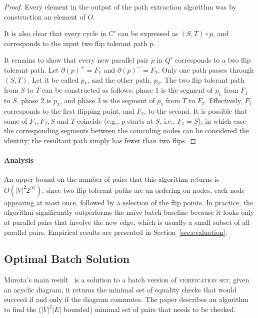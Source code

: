 \documentclass[sigplan,review,anonymous]{acmart}
\begin{document}
\begin{proof}
    Every element in the output of the path extraction algorithm was by construction an element of $O$.

    It is also clear that every cycle in $C'$ can be expressed as $(S, T) \circ p$, and corresponds to the input two flip tolerant path p.
    
    It remains to show that every new parallel pair $p$ in $Q'$ corresponds to a two flip tolerant path.
    Let $\partial(p)^+ = F_1$ and $\partial(p)^- = F_2$. 
    Only one path passes through $(S, T)$. Let it be called $p_1$, and the other path, $p_2$.
    The two flip tolerant path from $S$ to $T$ can be constructed as follows: phase 1 is the segment of $p_1$ from $F_1$ to $S$, phase 2 is $p_2$, and phase 3 is the segment of $p_1$ from $T$ to $F_2$.
    Effectively, $F_1$ corresponds to the first flipping point, and $F_2$, to the second.
    It is possible that some of $F_1, F_2, S$ and $T$ coincide (e.g., $p$ starts at $S$, i.e., $F_1 = S$), in which case the corresponding segments between the coinciding nodes can be considered the identity; the resultant path simply has fewer than two flips.
\end{proof}

\paragraph{Analysis}
An upper bound on the number of pairs that this algorithm returns is $O(|V|^{2} 2^{|V|})$, since two flip tolerant paths are an ordering on nodes, each node appearing at most once, followed by a selection of the flip points.
In practice, the algorithm significantly outperforms the na\"{i}ve batch baseline because it looks only at parallel pairs that involve the new edge, which is usually a small subset of all parallel pairs.
Empirical results are presented in Section~\ref{sec:evaluation}.

\subsection{Optimal Batch Solution}

\label{sec:batchBaseline}

Murota's main result~\cite{commutative} is a solution to a batch version of \textsc{verification set}; given an acyclic diagram, it returns the minimal set of equality checks that would succeed if and only if the diagram commutes.
The paper describes an algorithm to find the ($|V|^2|E|$ bounded) minimal set of pairs that needs to be checked.
\end{document}
